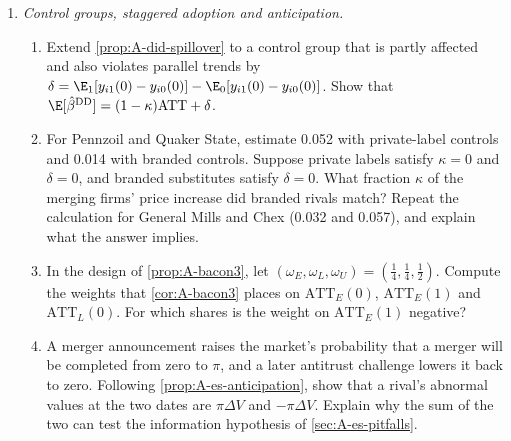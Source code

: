 \begin{enumerate}[label=\arabic*., leftmargin=*, itemsep=6pt]
\item \textit{Control groups, staggered adoption and anticipation.}
\begin{enumerate}[label=(\alph*)]
  \item Extend \cref{prop:A-did-spillover} to a control group that is partly affected and also violates parallel trends
  by $\delta = \E_1[y_{i1}(0) - y_{i0}(0)] - \E_0[y_{i1}(0) - y_{i0}(0)]$. Show that
  $\E[\hat\beta^{\mathrm{DD}}] = (1 - \kappa)\mathrm{ATT} + \delta$.
  \item For Pennzoil and Quaker State, \citet{AshenfelterHosken2010} estimate 0.052 with private-label controls and
  0.014 with branded controls. Suppose private labels satisfy $\kappa = 0$ and $\delta = 0$, and branded substitutes
  satisfy $\delta = 0$. What fraction $\kappa$ of the merging firms' price increase did branded rivals match? Repeat the
  calculation for General Mills and Chex (0.032 and 0.057), and explain what the answer implies.
  \item In the design of \cref{prop:A-bacon3}, let $(\omega_E, \omega_L, \omega_U) = (\frac{1}{4}, \frac{1}{4}, \frac{1}{2})$.
  Compute the weights that \cref{cor:A-bacon3} places on $\mathrm{ATT}_E(0)$, $\mathrm{ATT}_E(1)$ and
  $\mathrm{ATT}_L(0)$. For which shares is the weight on $\mathrm{ATT}_E(1)$ negative?
  \item A merger announcement raises the market's probability that a merger will be completed from zero to $\pi$, and a
  later antitrust challenge lowers it back to zero. Following \cref{prop:A-es-anticipation}, show that a rival's
  abnormal values at the two dates are $\pi\Delta V$ and $-\pi\Delta V$. Explain why the sum of the two can test the
  information hypothesis of \cref{sec:A-es-pitfalls}.
\end{enumerate}

\end{enumerate}
